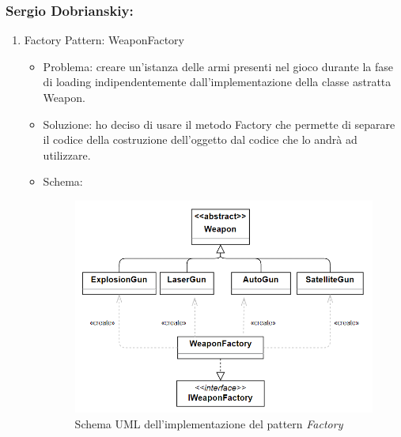 \documentclass[a4paper,12pt]{report}
\begin{document}
\subsubsection*{Sergio Dobrianskiy:}
%
\begin{enumerate}

	
	\item Factory Pattern: WeaponFactory
			
	\begin{itemize}
		\item Problema: creare un'istanza delle armi presenti nel gioco durante la fase di loading indipendentemente dall'implementazione della classe astratta Weapon.
		\item Soluzione: ho deciso di usare il metodo Factory che permette di separare il codice della costruzione dell'oggetto dal codice che lo andrà ad utilizzare.
		\item Schema:
		\begin{figure}[H]
			\centering{}
			\includegraphics[width=\textwidth]{img/factory.png}
			\caption{Schema UML dell'implementazione del pattern \emph{Factory}}
			\label{img:Factory Pattern}
		\end{figure}
	\end{itemize}
	

\end{enumerate}
\end{document}
